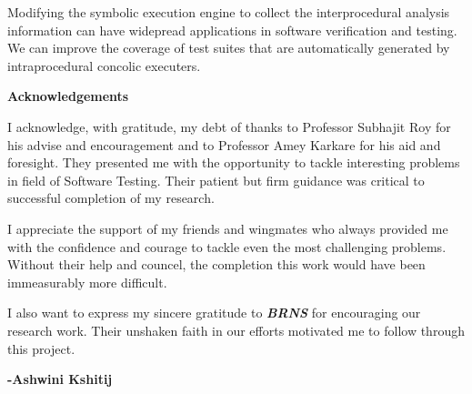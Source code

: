 \documentclass[12pt,oneside]{book}
\begin{document}
\vspace {0.5 cm}

Modifying the symbolic execution engine to collect the interprocedural analysis information can have widepread applications in software verification and testing. We can improve the coverage of test suites that are automatically generated by intraprocedural concolic executers.   

  






\newpage

\begin{center}
\textbf{\Large{Acknowledgements}}
\end{center}

\vspace{1.0 cm}

I acknowledge, with gratitude, my debt of thanks to Professor Subhajit Roy for his advise and encouragement and to Professor Amey Karkare for his aid and foresight. They presented me with the opportunity to tackle interesting problems in field of Software Testing. Their patient but firm guidance was critical to successful completion of my research.  

\vspace{0.5 cm}

I appreciate the support of my friends and wingmates who always provided me with the confidence and courage to tackle even the most challenging problems. Without their help and councel, the completion this work would have been immeasurably more difficult. 

\vspace{1.0 cm}

I also want to express my sincere gratitude to \textit {\textbf {BRNS}} for encouraging our research work. Their unshaken faith in our efforts motivated me to follow through this project.

\begin{flushright}
\textbf{-Ashwini Kshitij}
\end{flushright}

\newpage


\tableofcontents
\listoffigures
\listoftables


\mainmatter

\end{document}
